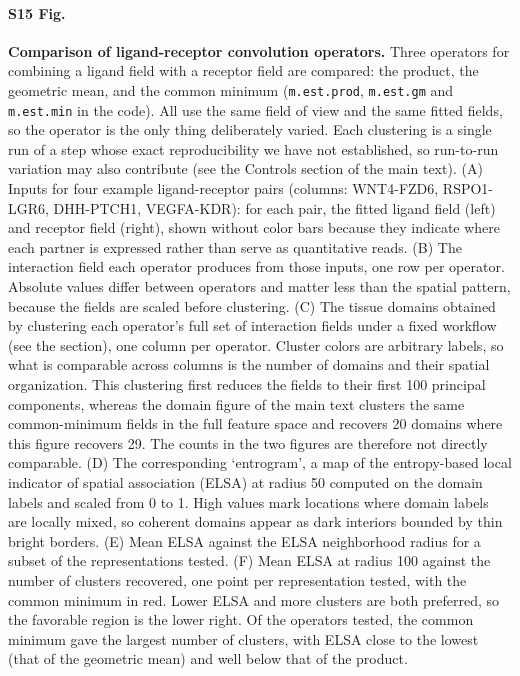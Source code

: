 \documentclass[10pt,letterpaper]{article}
\begin{document}
\paragraph*{S15 Fig.}
\label{S15_Fig}
\textbf{Comparison of ligand-receptor convolution operators.} Three operators for combining a ligand field with a receptor field are compared: the product, the geometric mean, and the common minimum (\texttt{m.est.prod}, \texttt{m.est.gm} and \texttt{m.est.min} in the code). All use the same field of view and the same fitted fields, so the operator is the only thing deliberately varied. Each clustering is a single run of a step whose exact reproducibility we have not established, so run-to-run variation may also contribute (see the Controls section of the main text). (A) Inputs for four example ligand-receptor pairs (columns: WNT4-FZD6, RSPO1-LGR6, DHH-PTCH1, VEGFA-KDR): for each pair, the fitted ligand field (left) and receptor field (right), shown without color bars because they indicate where each partner is expressed rather than serve as quantitative reads. (B) The interaction field each operator produces from those inputs, one row per operator. Absolute values differ between operators and matter less than the spatial pattern, because the fields are scaled before clustering. (C) The tissue domains obtained by clustering each operator's full set of interaction fields under a fixed workflow (see the  section), one column per operator. Cluster colors are arbitrary labels, so what is comparable across columns is the number of domains and their spatial organization. This clustering first reduces the fields to their first 100 principal components, whereas the domain figure of the main text clusters the same common-minimum fields in the full feature space and recovers 20 domains where this figure recovers 29. The counts in the two figures are therefore not directly comparable. (D) The corresponding `entrogram', a map of the entropy-based local indicator of spatial association (ELSA) \cite{naimi2019elsa} at radius 50 computed on the domain labels and scaled from 0 to 1. High values mark locations where domain labels are locally mixed, so coherent domains appear as dark interiors bounded by thin bright borders. (E) Mean ELSA against the ELSA neighborhood radius for a subset of the representations tested. (F) Mean ELSA at radius 100 against the number of clusters recovered, one point per representation tested, with the common minimum in red. Lower ELSA and more clusters are both preferred, so the favorable region is the lower right. Of the operators tested, the common minimum gave the largest number of clusters, with ELSA close to the lowest (that of the geometric mean) and well below that of the product.
\end{document}
